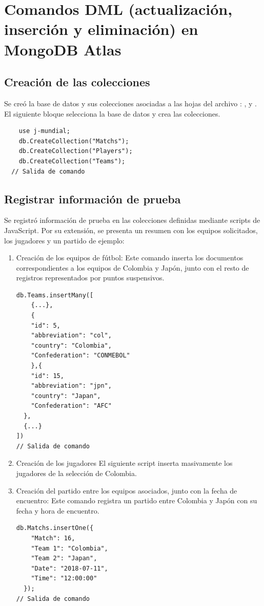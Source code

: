 \section{Comandos DML (actualización, inserción y eliminación) en MongoDB Atlas}

\subsection{Creación de las colecciones}

Se creó la base de datos  y sus colecciones asociadas a las hojas del archivo : ,  y . El siguiente bloque selecciona la base de datos y crea las colecciones.
\begin{lstlisting}
    use j-mundial;
    db.CreateCollection("Matchs");
    db.CreateCollection("Players");
    db.CreateCollection("Teams");
  // Salida de comando
\end{lstlisting}

\subsection{Registrar información de prueba}
Se registró información de prueba en las colecciones definidas mediante scripts de JavaScript. Por su extensión, se presenta un resumen con los equipos solicitados, los jugadores y un partido de ejemplo:

\begin{enumerate}
    \item Creación de los equipos de fútbol:
    Este comando inserta los documentos correspondientes a los equipos de Colombia y Japón, junto con el resto de registros representados por puntos suspensivos.
    \begin{lstlisting}
db.Teams.insertMany([
    {...},
    {
    "id": 5,
    "abbreviation": "col",
    "country": "Colombia",
    "Confederation": "CONMEBOL"
    },{
    "id": 15,
    "abbreviation": "jpn",
    "country": "Japan",
    "Confederation": "AFC"
  },
  {...}
])
// Salida de comando
    \end{lstlisting}
    \item Creación de los jugadores
    El siguiente script inserta masivamente los jugadores de la selección de Colombia.
    
    \item Creación del partido entre los equipos asociados, junto con la fecha de encuentro:
    Este comando registra un partido entre Colombia y Japón con su fecha y hora de encuentro.
    \begin{lstlisting}
db.Matchs.insertOne({
    "Match": 16,
    "Team 1": "Colombia",
    "Team 2": "Japan",
    "Date": "2018-07-11",
    "Time": "12:00:00"
  });
// Salida de comando
    \end{lstlisting}
    
\end{enumerate}
